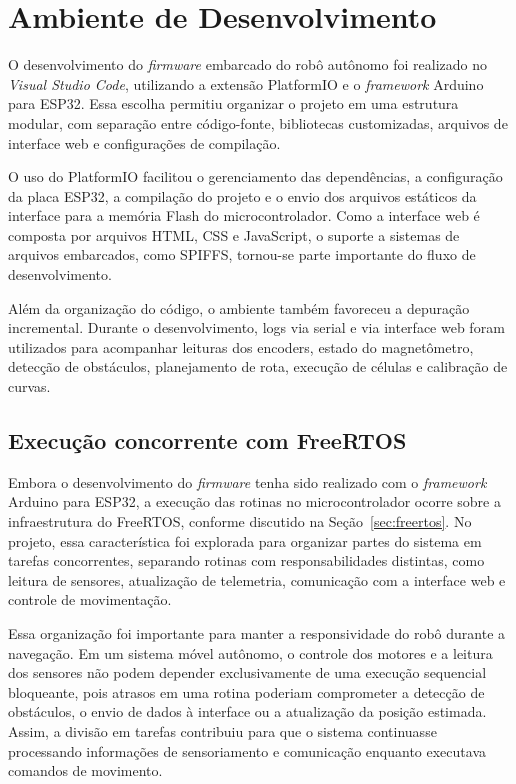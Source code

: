 \documentclass[	12pt, Times, openright, twoside, a4paper, english, brazil]{abntex2}
\begin{document}
\section{Ambiente de Desenvolvimento}
\label{sec:dev_ide}

O desenvolvimento do \textit{firmware} embarcado do robô autônomo foi realizado no \textit{Visual Studio Code}, utilizando a extensão PlatformIO e o \textit{framework} Arduino para ESP32. Essa escolha permitiu organizar o projeto em uma estrutura modular, com separação entre código-fonte, bibliotecas customizadas, arquivos de interface web e configurações de compilação.

O uso do PlatformIO facilitou o gerenciamento das dependências, a configuração da placa ESP32, a compilação do projeto e o envio dos arquivos estáticos da interface para a memória Flash do microcontrolador. Como a interface web é composta por arquivos HTML, CSS e JavaScript, o suporte a sistemas de arquivos embarcados, como SPIFFS, tornou-se parte importante do fluxo de desenvolvimento.

Além da organização do código, o ambiente também favoreceu a depuração incremental. Durante o desenvolvimento, logs via serial e via interface web foram utilizados para acompanhar leituras dos encoders, estado do magnetômetro, detecção de obstáculos, planejamento de rota, execução de células e calibração de curvas.

\subsection{Execução concorrente com FreeRTOS}

Embora o desenvolvimento do \textit{firmware} tenha sido realizado com o \textit{framework} Arduino para ESP32, a execução das rotinas no microcontrolador ocorre sobre a infraestrutura do FreeRTOS, conforme discutido na Seção~\ref{sec:freertos}. No projeto, essa característica foi explorada para organizar partes do sistema em tarefas concorrentes, separando rotinas com responsabilidades distintas, como leitura de sensores, atualização de telemetria, comunicação com a interface web e controle de movimentação.

Essa organização foi importante para manter a responsividade do robô durante a navegação. Em um sistema móvel autônomo, o controle dos motores e a leitura dos sensores não podem depender exclusivamente de uma execução sequencial bloqueante, pois atrasos em uma rotina poderiam comprometer a detecção de obstáculos, o envio de dados à interface ou a atualização da posição estimada. Assim, a divisão em tarefas contribuiu para que o sistema continuasse processando informações de sensoriamento e comunicação enquanto executava comandos de movimento.
\end{document}

